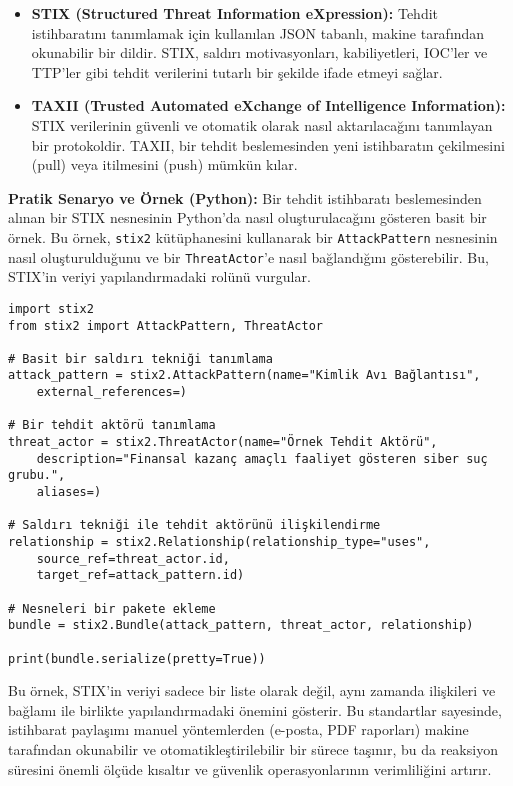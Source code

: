 \begin{itemize}
    \item \textbf{STIX (Structured Threat Information eXpression):} Tehdit istihbaratını tanımlamak için kullanılan JSON tabanlı, makine tarafından okunabilir bir dildir. STIX, saldırı motivasyonları, kabiliyetleri, IOC'ler ve TTP'ler gibi tehdit verilerini tutarlı bir şekilde ifade etmeyi sağlar.
    \item \textbf{TAXII (Trusted Automated eXchange of Intelligence Information):} STIX verilerinin güvenli ve otomatik olarak nasıl aktarılacağını tanımlayan bir protokoldir. TAXII, bir tehdit beslemesinden yeni istihbaratın çekilmesini (pull) veya itilmesini (push) mümkün kılar.
\end{itemize}

\textbf{Pratik Senaryo ve Örnek (Python):}
Bir tehdit istihbaratı beslemesinden alınan bir STIX nesnesinin Python'da nasıl oluşturulacağını gösteren basit bir örnek. Bu örnek, \texttt{stix2} kütüphanesini kullanarak bir \texttt{AttackPattern} nesnesinin nasıl oluşturulduğunu ve bir \texttt{ThreatActor}'e nasıl bağlandığını gösterebilir. Bu, STIX'in veriyi yapılandırmadaki rolünü vurgular.

\begin{verbatim}
import stix2
from stix2 import AttackPattern, ThreatActor

# Basit bir saldırı tekniği tanımlama
attack_pattern = stix2.AttackPattern(name="Kimlik Avı Bağlantısı",
    external_references=)

# Bir tehdit aktörü tanımlama
threat_actor = stix2.ThreatActor(name="Örnek Tehdit Aktörü",
    description="Finansal kazanç amaçlı faaliyet gösteren siber suç grubu.",
    aliases=)

# Saldırı tekniği ile tehdit aktörünü ilişkilendirme
relationship = stix2.Relationship(relationship_type="uses",
    source_ref=threat_actor.id,
    target_ref=attack_pattern.id)

# Nesneleri bir pakete ekleme
bundle = stix2.Bundle(attack_pattern, threat_actor, relationship)

print(bundle.serialize(pretty=True))

\end{verbatim}

Bu örnek, STIX'in veriyi sadece bir liste olarak değil, aynı zamanda ilişkileri ve bağlamı ile birlikte yapılandırmadaki önemini gösterir. Bu standartlar sayesinde, istihbarat paylaşımı manuel yöntemlerden (e-posta, PDF raporları) makine tarafından okunabilir ve otomatikleştirilebilir bir sürece taşınır, bu da reaksiyon süresini önemli ölçüde kısaltır ve güvenlik operasyonlarının verimliliğini artırır.

